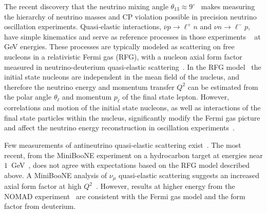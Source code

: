 
The recent discovery that the neutrino mixing angle $\theta_{13}\approx 9^\circ$~\cite{Abe:2011sj,Adamson:2013ue,Abe:2011fz,An:2012eh,Ahn:2012nd} makes measuring the hierarchy of neutrino masses and CP violation possible in precision neutrino oscillation experiments.  
Quasi-elastic interactions, $\overline{\nu} p \rightarrow \ell^+  n$ and  $\nu n \rightarrow \ell^- p$, have simple kinematics and serve as reference processes in those experiments ~\cite{AguilarArevalo:2008rc,Abe:2011sj,Ayres:2004js} at GeV energies. These processes are typically modeled as scattering on free nucleons in a relativistic Fermi gas (RFG), with a nucleon axial form factor measured in neutrino-deuterium quasi-elastic scattering~\cite{Bodek:2007vi,Kuzmin:2007kr}. In the RFG model~\cite{Smith:1972xh} the initial state nucleons are independent in the mean field of the nucleus, and therefore the neutrino energy and momentum transfer $Q^2$ can be estimated from the polar angle $\theta_\ell$ and momentum $p_\ell$ of the final state lepton. 
However, correlations and motion of the initial state nucleons, as well as interactions of the final state particles within the nucleus, significantly modify the Fermi gas picture and affect the neutrino energy reconstruction in oscillation experiments~\cite{Martini:2012uc,Lalakulich:2012hs,Nieves:2012yz}. 

Few measurements of antineutrino quasi-elastic scattering exist~\cite{Bonetti:1977cs,Ahrens:1988rr,AguilarArevalo:2013hm}.  
The most recent, from the MiniBooNE experiment on a hydrocarbon target at energies near $1$~GeV~\cite{AguilarArevalo:2013hm}, does not agree with expectations based on the RFG model described above.  A MiniBooNE analysis of $\nu_\mu$ quasi-elastic scattering suggests an increased axial form factor at high $Q^2$~\cite{AguilarArevalo:2007ab}. 
However, results at higher energy from the NOMAD experiment~\cite{Lyubushkin:2008pe} are consistent with the Fermi gas model and the form factor from deuterium.

